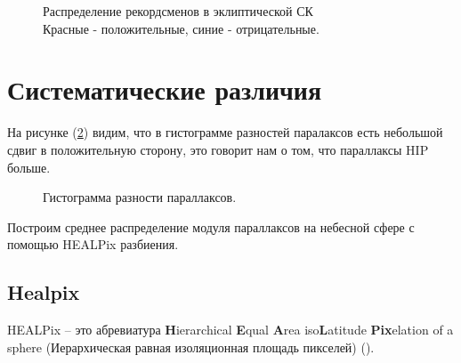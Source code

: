 \documentclass[14pt]{article} %
\begin{document}
\begin{figure}[h!]
\caption{Распределение рекордсменов в эклиптической СК\\Красные - положительные, синие - отрицательные.}
\label{img:75maxlonlat}
\end{figure}

\section{Систематические различия}\label{sistem}
На рисунке (\ref{img:hist_par_deff}) видим, что в гистограмме разностей паралаксов есть небольшой сдвиг в положительную сторону, это говорит нам о том, что параллаксы HIP больше.

\begin{figure}[h!]
\caption{Гистограмма разности параллаксов.}
\label{img:hist_par_deff}
\end{figure}

Построим среднее распределение модуля параллаксов на небесной сфере с помощью HEALPix разбиения.

\subsection{Healpix}\label{sub:smthhealpix}
HEALPix -- это абревиатура \textbf{H}ierarchical \textbf{E}qual \textbf{A}rea iso\textbf{L}atitude \textbf{Pix}elation of a sphere (Иерархическая равная изоляционная площадь пикселей) (\cite{book:healpix}).
\end{document}
